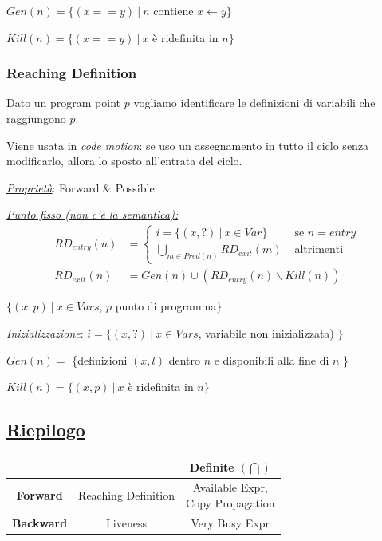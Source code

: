 \documentclass[a4paper, 11pt]{report}
\begin{document}
$Gen(n) = \{(x == y) ~|~ n$ contiene $x\leftarrow y \}$

$Kill(n) = \{(x == y) ~|~ x$ è ridefinita in $n \}$

\subsubsection*{Reaching Definition}
Dato un program point $p$ vogliamo identificare le definizioni di variabili che raggiungono $p$.

\noindent
Viene usata in \textit{code motion}: se uso un assegnamento in tutto il ciclo senza modificarlo, allora lo sposto all'entrata del ciclo.
\newline

\noindent
\textit{\underline{Proprietà}}: Forward \& Possible
\newline

\noindent
\underline{\textit{Punto fisso (non c'è la semantica):}}
\begin{align*}
RD_{entry}(n) &=
\begin{cases}
i=\{(x, ?) ~|~ x\in Var \} &\text{ se $n= entry$} \\
\bigcup_{m\in Pred(n)} RD_{exit}(m) &\text{ altrimenti}
\end{cases}\\
RD_{exit}(n) &= Gen(n) \cup (RD_{entry}(n)\backslash Kill(n))
\end{align*}

$\{(x, p) ~|~ x\in Vars$, $p$ punto di programma$\}$

\textit{Inizializzazione}: $i=\{(x, ?) ~|~ x\in Vars$, variabile non inizializzata)  $\}$

$Gen(n) =$ \{definizioni $(x, l)$ dentro $n$ e disponibili alla fine di $n$ \}

$Kill(n) = \{(x,p) ~|~ x$ è ridefinita in $n \}$

\newpage
\subsection*{\underline{Riepilogo}}

\begin{center}
	\begin{tabular}{c|c|c}
		&\thead{\textbf{Possible $(\bigcup)$}}&\textbf{Definite $(\bigcap)$}\\ \hline
		\textbf{Forward}&Reaching Definition&\makecell{Available Expr, \\Copy Propagation}\\ \hline
		\makecell{\textbf{Backward}\\}&Liveness&Very Busy Expr\\
	\end{tabular}
\end{center}
\end{document}
